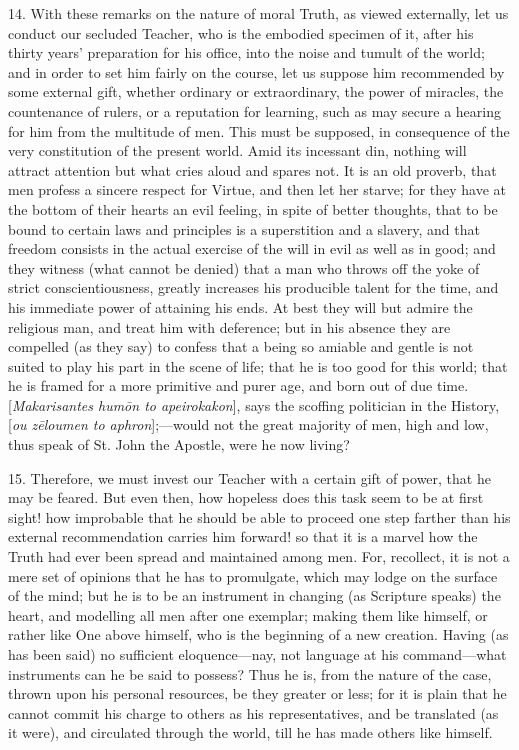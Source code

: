 14. With these remarks on the nature of moral Truth, as viewed
externally, let us conduct our secluded Teacher, who is the embodied
specimen of it, after his thirty years' preparation for his office,
into the noise and tumult of the world; and in order to set him fairly
on the course, let us suppose him recommended by some external gift,
whether ordinary or extraordinary, the power of miracles, the
countenance of rulers, or a reputation for learning, such as may
secure a hearing for him from the multitude of men. This must be
supposed, in consequence of the very constitution of the present
world. Amid its incessant din, nothing will attract attention but what
cries aloud and spares not. It is an old proverb, that men profess a
sincere respect for Virtue, and then let her starve; for they have at
the bottom of their hearts an evil feeling, in spite of better
thoughts, that to be bound to certain laws and principles is a
superstition and a slavery, and that freedom consists in the actual
exercise of the will in evil as well as in good; and they witness
(what cannot be denied) that a man who throws off the yoke of strict
conscientiousness, greatly increases his producible talent for the
time, and his immediate power of attaining his ends. At best they will
but admire the religious man, and treat him with deference; but in his
absence they are compelled (as they say) to confess that a being so
amiable and gentle is not suited to play his part in the scene of
life; that he is too good for this world; that he is framed for a more
primitive and purer age, and born out of due time. [\emph{Makarisantes
hum\={o}n to apeirokakon}],
says the scoffing politician in the History, [\emph{ou
z\={e}loumen to aphron}];—would not the great
majority of men, high and low, thus speak of St. John the Apostle,
were he now living?

15. Therefore, we must invest our Teacher with a certain gift of
power, that he may be feared. But even then, how hopeless does this
task seem to be at first sight! how improbable that he should be able
to proceed one step farther than his external recommendation carries
him forward! so that it is a marvel how the Truth had ever been spread
and maintained among men. For, recollect, it is not a mere set of
opinions that he has to promulgate, which may lodge on the surface of
the mind; but he is to be an instrument in changing (as Scripture
speaks) the heart, and modelling all men after one exemplar; making
them like himself, or rather like One above himself, who is the
beginning of a new creation. Having (as has been said) no sufficient
eloquence—nay, not language at his command—what instruments can he
be said to possess? Thus he is, from the nature of the case, thrown
upon his personal resources, be they greater or less; for it is plain
that he cannot commit his charge to others as his representatives, and
be translated (as it were), and circulated through the world, till he
has made others like himself.

